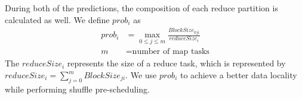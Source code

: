 During both of the predictions, the composition of each reduce partition is calculated as well. We define $prob_i$ as
\begin{equation}
\label{equationprob}
\begin{aligned}
	prob_i &= \max_{0 \leq j \leq m} \frac{BlockSize_{kji}}{reduceSize_i} \\
	m &= \text{number of map tasks}
\end{aligned}
\end{equation}
The $reduceSize_i$ represents the size of a reduce task, which is represented by $reduceSize_i = \sum_{j=0}^{m} {BlockSize_{ji}}$.
We use $prob_i$ to achieve a better data locality while performing shuffle pre-scheduling. 


